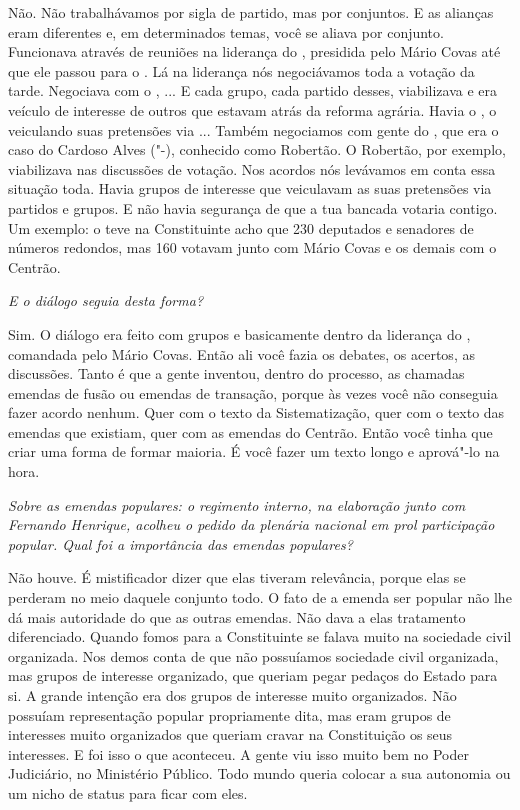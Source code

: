 Não. Não trabalhávamos por sigla de partido, mas por
conjuntos. E as alianças eram diferentes e, em determinados temas, você
se aliava por conjunto. Funcionava através de reuniões na liderança do
, presidida pelo Mário Covas até que ele passou para o . Lá na
liderança nós negociávamos toda a votação da tarde. Negociava com o ,
... E cada grupo, cada partido desses, viabilizava e era veículo de
interesse de outros que estavam atrás da reforma agrária. Havia o , o
 veiculando suas pretensões via ... Também negociamos com gente do
, que era o caso do Cardoso Alves ("-), conhecido como
Robertão. O Robertão, por exemplo, viabilizava nas discussões de
votação. Nos acordos nós levávamos em conta essa situação toda. Havia
grupos de interesse que veiculavam as suas pretensões via partidos e
grupos. E não havia segurança de que a tua bancada votaria contigo. Um
exemplo: o  teve na Constituinte acho que 230 deputados e senadores
de números redondos, mas 160 votavam junto com Mário Covas e os demais
com o Centrão.

\medskip

\emph{E o diálogo seguia desta forma?}

Sim. O diálogo era feito com grupos e basicamente dentro
da liderança do , comandada pelo Mário Covas. Então ali você fazia
os debates, os acertos, as discussões. Tanto é que a gente inventou,
dentro do processo, as chamadas emendas de fusão ou emendas de
transação, porque às vezes você não conseguia fazer acordo nenhum. Quer
com o texto da Sistematização, quer com o texto das emendas que
existiam, quer com as emendas do Centrão. Então você tinha que criar uma
forma de formar maioria. É você fazer um texto longo e aprová"-lo na
hora.

\medskip

\emph{Sobre as emendas populares: o regimento interno, na elaboração
junto com Fernando Henrique, acolheu o pedido da plenária nacional em
prol participação popular. Qual foi a importância das emendas
populares?}

Não houve. É mistificador dizer que elas tiveram
relevância, porque elas se perderam no meio daquele conjunto todo. O
fato de a emenda ser popular não lhe dá mais autoridade do que as outras
emendas. Não dava a elas tratamento diferenciado. Quando fomos para a
Constituinte se falava muito na sociedade civil organizada. Nos demos
conta de que não possuíamos sociedade civil organizada, mas grupos de
interesse organizado, que queriam pegar pedaços do Estado para si. A
grande intenção era dos grupos de interesse muito organizados. Não
possuíam representação popular propriamente dita, mas eram grupos de
interesses muito organizados que queriam cravar na Constituição os seus
interesses. E foi isso o que aconteceu. A gente viu isso muito bem no
Poder Judiciário, no Ministério Público. Todo mundo queria colocar a sua
autonomia ou um nicho de status para ficar com eles.


